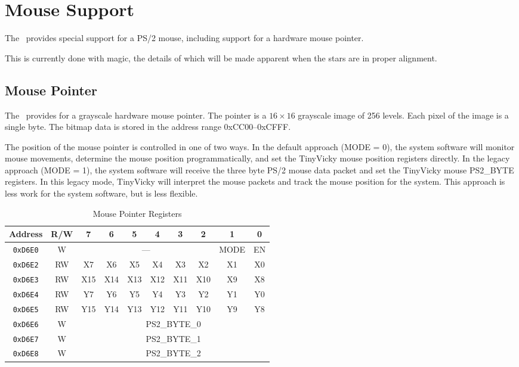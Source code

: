 \section*{Mouse Support}

The \jr\ provides special support for a PS/2 mouse, including support for a hardware mouse pointer.

This is currently done with magic, the details of which will be made apparent when the stars are in proper alignment.

\subsection*{Mouse Pointer}

The \jr\ provides for a grayscale hardware mouse pointer. The pointer is a $16 \times 16$ grayscale image of 256 levels. Each pixel of the image is a single byte. The bitmap data is stored in the address range 0xCC00--0xCFFF.

The position of the mouse pointer is controlled in one of two ways. In the default approach (MODE = 0), the system software will monitor mouse movements, determine the mouse position programmatically, and set the TinyVicky mouse position registers directly. In the legacy approach (MODE = 1), the system software will receive the three byte PS/2 mouse data packet and set the TinyVicky mouse PS2\_BYTE registers. In this legacy mode, TinyVicky will interpret the mouse packets and track the mouse position for the system. This approach is less work for the system software, but is less flexible.

\begin{table}[ht]
    \begin{center}
        \begin{tabular}{|c|c|c|c|c|c|c|c|c|c|} \hline
            Address & R/W & 7 & 6 & 5 & 4 & 3 & 2 & 1 & 0 \\\hline\hline
            \verb+0xD6E0+ & W & \multicolumn{6}{|c|}{---} & MODE & EN \\\hline
            \verb+0xD6E2+ & RW & X7 & X6 & X5 & X4 & X3 & X2 & X1 & X0 \\\hline
            \verb+0xD6E3+ & RW & X15 & X14 & X13 & X12 & X11 & X10 & X9 & X8 \\\hline
            \verb+0xD6E4+ & RW & Y7 & Y6 & Y5 & Y4 & Y3 & Y2 & Y1 & Y0 \\\hline
            \verb+0xD6E5+ & RW & Y15 & Y14 & Y13 & Y12 & Y11 & Y10 & Y9 & Y8 \\\hline
            \verb+0xD6E6+ & W & \multicolumn{8}{|c|}{PS2\_BYTE\_0} \\\hline
            \verb+0xD6E7+ & W & \multicolumn{8}{|c|}{PS2\_BYTE\_1} \\\hline
            \verb+0xD6E8+ & W & \multicolumn{8}{|c|}{PS2\_BYTE\_2} \\\hline
        \end{tabular}
    \end{center}
    \caption{Mouse Pointer Registers}
    \label{tab:mouse_reg}
\end{table}

